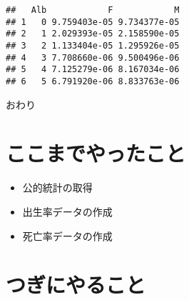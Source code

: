 \documentclass[
]{book}
\newenvironment{Shaded}{\begin{snugshade}}{\end{snugshade}}
\newcommand{\DataTypeTok}[1]{\textcolor[rgb]{0.13,0.29,0.53}{#1}}
\newcommand{\DecValTok}[1]{\textcolor[rgb]{0.00,0.00,0.81}{#1}}
\newcommand{\KeywordTok}[1]{\textcolor[rgb]{0.13,0.29,0.53}{\textbf{#1}}}
\newcommand{\NormalTok}[1]{#1}
\newcommand{\OperatorTok}[1]{\textcolor[rgb]{0.81,0.36,0.00}{\textbf{#1}}}
\newcommand{\StringTok}[1]{\textcolor[rgb]{0.31,0.60,0.02}{#1}}
\providecommand{\tightlist}{%
  \setlength{\itemsep}{0pt}\setlength{\parskip}{0pt}}
\begin{document}
\begin{Shaded}
\end{Shaded}

\begin{verbatim}
##   Alb            F            M
## 1   0 9.759403e-05 9.734377e-05
## 2   1 2.029393e-05 2.158590e-05
## 3   2 1.133404e-05 1.295926e-05
## 4   3 7.708660e-06 9.500496e-06
## 5   4 7.125279e-06 8.167034e-06
## 6   5 6.791920e-06 8.833763e-06
\end{verbatim}

おわり

\hypertarget{ux3053ux3053ux307eux3067ux3084ux3063ux305fux3053ux3068}{%
\section{ここまでやったこと}\label{ux3053ux3053ux307eux3067ux3084ux3063ux305fux3053ux3068}}

\begin{itemize}
\tightlist
\item
  公的統計の取得
\item
  出生率データの作成
\item
  死亡率データの作成
\end{itemize}

\hypertarget{ux3064ux304eux306bux3084ux308bux3053ux3068}{%
\section{つぎにやること}\label{ux3064ux304eux306bux3084ux308bux3053ux3068}}
\end{document}
